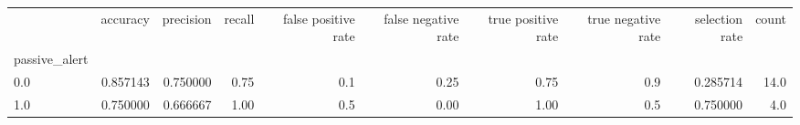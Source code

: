 \begin{tabular}{lrrrrrrrrr}
\toprule
{} &  accuracy &  precision &  recall &  false positive rate &  false negative rate &  true positive rate &  true negative rate &  selection rate &  count \\
passive\_alert &           &            &         &                      &                      &                     &                     &                 &        \\
\midrule
0.0           &  0.857143 &   0.750000 &    0.75 &                  0.1 &                 0.25 &                0.75 &                 0.9 &        0.285714 &   14.0 \\
1.0           &  0.750000 &   0.666667 &    1.00 &                  0.5 &                 0.00 &                1.00 &                 0.5 &        0.750000 &    4.0 \\
\bottomrule
\end{tabular}
